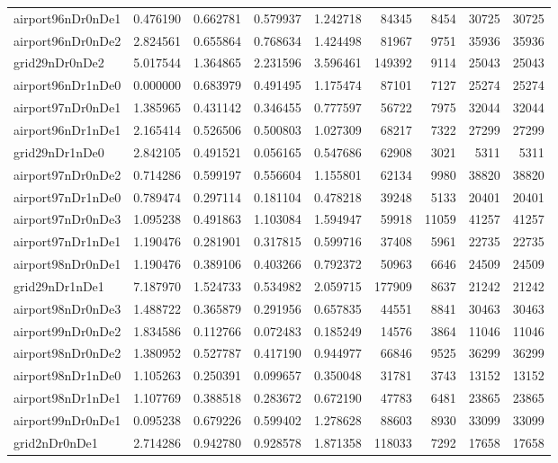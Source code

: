 \begin{longtable}{|l|r|r|r|r|r|r|r|r|}
airport96nDr0nDe1 & 0.476190 & 0.662781 & 0.579937 & 1.242718 & 84345 & 8454 & 30725 & 30725 \\
airport96nDr0nDe2 & 2.824561 & 0.655864 & 0.768634 & 1.424498 & 81967 & 9751 & 35936 & 35936 \\
grid29nDr0nDe2 & 5.017544 & 1.364865 & 2.231596 & 3.596461 & 149392 & 9114 & 25043 & 25043 \\
airport96nDr1nDe0 & 0.000000 & 0.683979 & 0.491495 & 1.175474 & 87101 & 7127 & 25274 & 25274 \\
airport97nDr0nDe1 & 1.385965 & 0.431142 & 0.346455 & 0.777597 & 56722 & 7975 & 32044 & 32044 \\
airport96nDr1nDe1 & 2.165414 & 0.526506 & 0.500803 & 1.027309 & 68217 & 7322 & 27299 & 27299 \\
grid29nDr1nDe0 & 2.842105 & 0.491521 & 0.056165 & 0.547686 & 62908 & 3021 & 5311 & 5311 \\
airport97nDr0nDe2 & 0.714286 & 0.599197 & 0.556604 & 1.155801 & 62134 & 9980 & 38820 & 38820 \\
airport97nDr1nDe0 & 0.789474 & 0.297114 & 0.181104 & 0.478218 & 39248 & 5133 & 20401 & 20401 \\
airport97nDr0nDe3 & 1.095238 & 0.491863 & 1.103084 & 1.594947 & 59918 & 11059 & 41257 & 41257 \\
airport97nDr1nDe1 & 1.190476 & 0.281901 & 0.317815 & 0.599716 & 37408 & 5961 & 22735 & 22735 \\
airport98nDr0nDe1 & 1.190476 & 0.389106 & 0.403266 & 0.792372 & 50963 & 6646 & 24509 & 24509 \\
grid29nDr1nDe1 & 7.187970 & 1.524733 & 0.534982 & 2.059715 & 177909 & 8637 & 21242 & 21242 \\
airport98nDr0nDe3 & 1.488722 & 0.365879 & 0.291956 & 0.657835 & 44551 & 8841 & 30463 & 30463 \\
airport99nDr0nDe2 & 1.834586 & 0.112766 & 0.072483 & 0.185249 & 14576 & 3864 & 11046 & 11046 \\
airport98nDr0nDe2 & 1.380952 & 0.527787 & 0.417190 & 0.944977 & 66846 & 9525 & 36299 & 36299 \\
airport98nDr1nDe0 & 1.105263 & 0.250391 & 0.099657 & 0.350048 & 31781 & 3743 & 13152 & 13152 \\
airport98nDr1nDe1 & 1.107769 & 0.388518 & 0.283672 & 0.672190 & 47783 & 6481 & 23865 & 23865 \\
airport99nDr0nDe1 & 0.095238 & 0.679226 & 0.599402 & 1.278628 & 88603 & 8930 & 33099 & 33099 \\
grid2nDr0nDe1 & 2.714286 & 0.942780 & 0.928578 & 1.871358 & 118033 & 7292 & 17658 & 17658 \\

\end{longtable}
